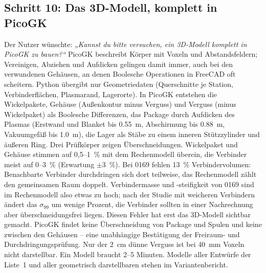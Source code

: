 \subsection*{Schritt 10: Das 3D-Modell, komplett in PicoGK}
Der Nutzer wünschte: \emph{„Kannst du bitte versuchen, ein 3D-Modell komplett in PicoGK zu bauen?“} PicoGK
\cite{picogk} beschreibt Körper mit Voxeln und Abstandsfeldern; Vereinigen, Abziehen und Aufdicken gelingen damit
immer, auch bei den verwundenen Gehäusen, an denen Boolesche Operationen in FreeCAD oft scheitern. Python übergibt
nur Geometriedaten (Querschnitte je Station, Verbinderflächen, Plasmarand, Lagerorte). In PicoGK entstehen die
Wickelpakete, Gehäuse (Außenkontur minus Verguss) und Verguss (minus Wickelpaket) als Boolesche Differenzen, das
Package durch Aufdicken des Plasmas (Erstwand und Blanket bis \SI{0,55}{m}, Abschirmung bis \SI{0,88}{m},
Vakuumgefäß bis \SI{1,0}{m}), die Lager als Stäbe zu einem inneren Stützzylinder und äußeren Ring. Drei Prüfkörper
zeigen Überschneidungen.
Wickelpaket und Gehäuse stimmen auf 0,5--1~\% mit dem Rechenmodell überein, die Verbinder meist auf 0--3~\%
(Erwartung $\pm3$~\%). Bei 0169 fehlen 13~\% Verbindervolumen: Benachbarte Verbinder durchdringen sich dort
teilweise, das Rechenmodell zählt den gemeinsamen Raum doppelt. Verbindermasse und -steifigkeit von 0169 sind im
Rechenmodell also etwas zu hoch; nach der Studie mit weicheren Verbindern ändert das $\sigma_{99}$ um wenige
Prozent, die Verbinder sollten in einer Nachrechnung aber überschneidungsfrei liegen. Diesen Fehler hat erst das
3D-Modell sichtbar gemacht. PicoGK findet keine
Überschneidung von Package und Spulen und keine zwischen den Gehäusen -- eine unabhängige Bestätigung der Freiraum-
und Durchdringungsprüfung. Nur der \SI{2}{cm} dünne Verguss ist bei \SI{40}{mm} Voxeln nicht darstellbar. Ein Modell
braucht 2--5 Minuten. Modelle aller Entwürfe der Liste~1 und aller geometrisch darstellbaren stehen im
Variantenbericht.

